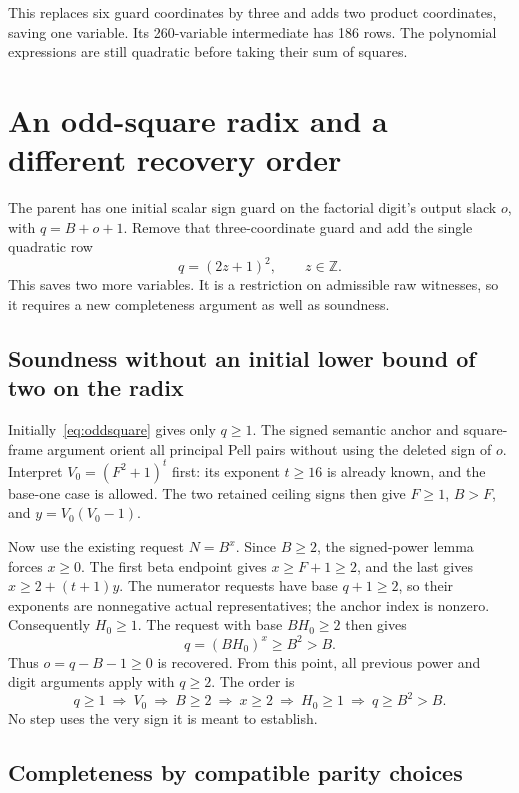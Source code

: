 \documentclass[11pt]{article}
\newcommand{\Z}{\mathbb Z}
\begin{document}
This replaces six guard coordinates by three and adds two product
coordinates, saving one variable. Its 260-variable intermediate has
186 rows. The polynomial expressions are still quadratic before taking
their sum of squares.

\section{An odd-square radix and a different recovery order}
\label{sec:odd}

The parent has one initial scalar sign guard on the factorial digit's
output slack $o$, with $q=B+o+1$. Remove that three-coordinate guard and
add the single quadratic row
\begin{equation}
 q=(2z+1)^2,\qquad z\in\Z.
 \label{eq:oddsquare}
\end{equation}
This saves two more variables. It is a restriction on admissible raw
witnesses, so it requires a new completeness argument as well as soundness.

\subsection{Soundness without an initial lower bound of two on the radix}

Initially~\eqref{eq:oddsquare} gives only $q\ge1$. The signed semantic
anchor and square-frame argument orient all principal Pell pairs without
using the deleted sign of $o$. Interpret $V_0=(F^2+1)^t$ first: its
exponent $t\ge16$ is already known, and the base-one case is allowed.
The two retained ceiling signs then give $F\ge1$, $B>F$, and
$y=V_0(V_0-1)$.

Now use the existing request $N=B^x$. Since $B\ge2$, the signed-power
lemma forces $x\ge0$. The first beta endpoint gives $x\ge F+1\ge2$,
and the last gives $x\ge2+(t+1)y$. The numerator requests have base
$q+1\ge2$, so their exponents are nonnegative actual representatives;
the anchor index is nonzero. Consequently $H_0\ge1$. The request with
base $BH_0\ge2$ then gives
\[
 q=(BH_0)^x\ge B^2>B.
\]
Thus $o=q-B-1\ge0$ is recovered. From this point, all previous power
and digit arguments apply with $q\ge2$. The order is
\[
 q\ge1\ \Rightarrow\ V_0\ \Rightarrow\ B\ge2
 \ \Rightarrow\ x\ge2\ \Rightarrow\ H_0\ge1
 \ \Rightarrow\ q\ge B^2>B.
\]
No step uses the very sign it is meant to establish.

\subsection{Completeness by compatible parity choices}
\end{document}
